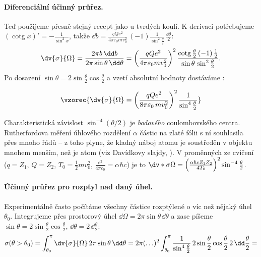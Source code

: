 \paragraph{Diferenciální účinný průřez.}
Teď použijeme přesně stejný recept jako u tvrdých koulí. K derivaci potřebujeme $(\operatorname{cotg} x)' = -\frac{1}{\sin^2 x}$, takže $\dd b = \frac{qQe^2}{4\pi\varepsilon_0 m v_0^2}\,(-1)\frac{1}{\sin^2\frac{\theta}{2}}\,\frac{\dd\theta}{2}$:
\begin{equation}
  \dv{\sigma}{\Omega} = \frac{2\pi b\,\dd b}{2\pi\sin\theta\,\dd\theta}
  = \left(\frac{qQe^2}{4\pi\varepsilon_0 m v_0^2}\right)^2
    \frac{\operatorname{cotg}\frac{\theta}{2}\,(-1)\,\frac12}{\sin\theta\,\sin^2\frac{\theta}{2}} .
\end{equation}
Po dosazení $\sin\theta = 2\sin\frac{\theta}{2}\cos\frac{\theta}{2}$ a vzetí absolutní hodnoty dostáváme :
\begin{veta}
\begin{equation}
  \vzorec{\dv{\sigma}{\Omega} = \left(\frac{qQe^2}{8\pi\varepsilon_0\, m v_0^2}\right)^2 \frac{1}{\sin^4\frac{\theta}{2}}}
\end{equation}
\end{veta}
Charakteristická závislost $\sin^{-4}(\theta/2)$ je  \emph{bodového} coulombovského centra. Rutherfordova měření úhlového rozdělení $\alpha$ částic na zlaté fólii s ní souhlasila přes mnoho řádů -- z toho plyne, že kladný náboj atomu je soustředěn v objektu mnohem menším, než je atom (viz Davídkovy slajdy, ). V proměnných ze cvičení ($q=Z_1$, $Q=Z_2$, $T_0 = \frac12 m v_0^2$, $\frac{e^2}{4\pi\varepsilon_0} = \alpha\hbar c$) je to $\dv*{\sigma}{\Omega} = \left(\frac{\alpha\hbar c Z_1Z_2}{4T_0}\right)^2\sin^{-4}\frac{\theta}{2}$.

\paragraph{Účinný průřez pro rozptyl nad daný úhel.}
Experimentálně často počítáme všechny částice rozptýlené o víc než nějaký úhel $\theta_0$. Integrujeme přes prostorový úhel $\dd\Omega = 2\pi\sin\theta\,\dd\theta$ a zase píšeme $\sin\theta = 2\sin\frac\theta2\cos\frac\theta2$, $\dd\theta = 2\,\dd\frac{\theta}{2}$:
\begin{equation}
  \sigma(\theta>\theta_0) = \int_{\theta_0}^{\pi}\dv{\sigma}{\Omega}\,2\pi\sin\theta\,\dd\theta
  = 2\pi(\ldots)^2\int_{\theta_0}^{\pi}\frac{1}{\sin^4\frac{\theta}{2}}\,2\sin\frac{\theta}{2}\cos\frac{\theta}{2}\,2\,\dd\frac{\theta}{2} =
\end{equation}


